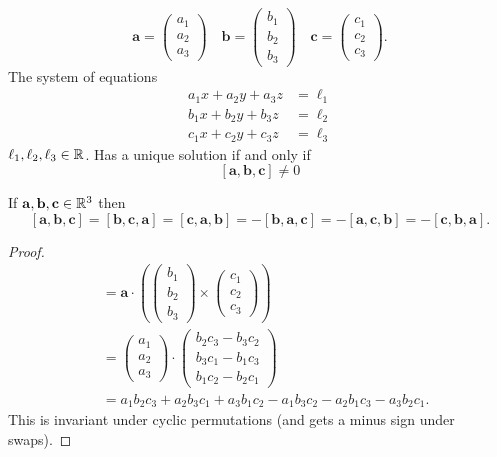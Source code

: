 \documentclass[10pt, a4paper]{article}
\newcommand{\mbf}[1]{\mathbf{#1}}
\begin{document}
\[
\mbf{a} = \begin{pmatrix}
    a_1 \\ a_2 \\ a_3
\end{pmatrix}\quad\mbf{b} = \begin{pmatrix}
    b_1 \\ b_2 \\ b_3
\end{pmatrix}\quad\mbf{c} = \begin{pmatrix}
    c_1 \\ c_2 \\ c_3
\end{pmatrix}.
\]
The system of equations
\begin{align*}
    a_1 x + a_2 y + a_3 z &= \ell_1 \\
    b_1 x + b_2 y + b_3 z &= \ell_2 \\
    c_1 x + c_2 y + c_3 z &= \ell_3
\end{align*}
$\ell_1, \ell_2, \ell_3 \in \mathbb{R}$.
Has a unique solution if and only if
\[
[\mbf{a}, \mbf{b}, \mbf{c}] \neq 0
\]

\begin{proposition}
    If $\mbf{a, b, c} \in \R ^ 3$ then
    \[
    [\mbf{a}, \mbf{b}, \mbf{c}] = [\mbf{b}, \mbf{c}, \mbf{a}] = [\mbf{c}, \mbf{a}, \mbf{b}] = -[\mbf{b}, \mbf{a}, \mbf{c}] = -[\mbf{a}, \mbf{c}, \mbf{b}] = -[\mbf{c}, \mbf{b}, \mbf{a}].
    \]
    \begin{proof}
        \begin{align*}
        [\mbf{a}, \mbf{b}, \mbf{c}] &= \mbf{a} \cdot \left(\begin{pmatrix}
            b_1 \\ b_2 \\ b_3
        \end{pmatrix} \times
        \begin{pmatrix}
            c_1 \\ c_2 \\ c_3
        \end{pmatrix}\right) \\
        &= \begin{pmatrix}
            a_1 \\ a_2 \\ a_3
        \end{pmatrix}
        \cdot
        \begin{pmatrix}
            b_2 c_3 - b_3 c_2 \\ b_3 c_1 - b_1 c_3 \\ b_1 c_2 - b_2 c_1
        \end{pmatrix} \\
        &= a_1 b_2 c_3 + a_2 b_3 c_1 + a_3 b_1 c_2 - a_1 b_3 c_2 - a_2 b_1 c_3 - a_3 b_2 c_1.
        \end{align*}
        This is invariant under cyclic permutations (and gets a minus sign under swaps).
    \end{proof}
\end{proposition}
\end{document}
